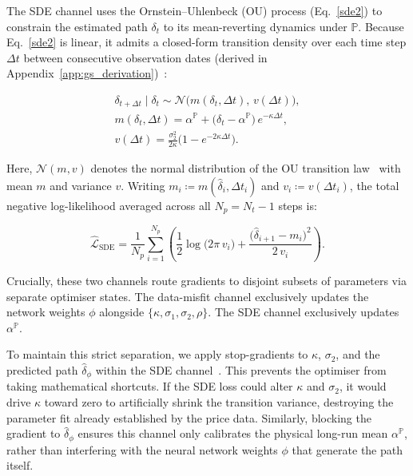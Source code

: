 \documentclass[sigconf, authorversion=true, nonacm=true]{acmart}
\begin{document}
The SDE channel uses the Ornstein--Uhlenbeck (OU) process (Eq.~\ref{sde2}) to constrain the estimated path $\delta_t$ to its mean-reverting dynamics under $\mathbb{P}$. Because Eq.~\ref{sde2} is linear, it admits a closed-form transition density over each time step $\Delta t$ between consecutive observation dates (derived in Appendix~\ref{app:gs_derivation})~\cite{Schwartz1997TheHedging, vasicek1977equilibrium}:

\begin{equation}
\begin{gathered}
  \delta_{t+\Delta t} \mid \delta_t \sim \mathcal{N}\!\big(m(\delta_t, \Delta t),\, v(\Delta t)\big), \\
  m(\delta_t, \Delta t) = \alpha^{\mathbb{P}} + \big(\delta_t - \alpha^{\mathbb{P}}\big)\,e^{-\kappa \Delta t}, \\
  v(\Delta t) = \frac{\sigma_2^2}{2\kappa} \Big(1 - e^{-2\kappa \Delta t}\Big).
\end{gathered}
\end{equation}

Here, $\mathcal{N}(m, v)$ denotes the normal distribution of the OU transition law~\cite{uhlenbeck1930theory, vasicek1977equilibrium} with mean $m$ and variance $v$. Writing $m_i \coloneqq m(\hat{\delta}_i, \Delta t_i)$ and $v_i \coloneqq v(\Delta t_i)$, the total negative log-likelihood averaged across all $N_p = N_t - 1$ steps is:

\begin{equation}
    \hat{\mathcal{L}}_{\text{SDE}} = \frac{1}{N_p}
  \sum_{i=1}^{N_p} \left(
    \frac{1}{2}\log\!\big(2\pi\, v_i\big)
      + \frac{\big(\hat{\delta}_{i+1} - m_i\big)^2}{2\,v_i} \right).
\end{equation}

Crucially, these two channels route gradients to disjoint subsets of parameters via separate optimiser states. The data-misfit channel exclusively updates the network weights $\phi$ alongside $\{\kappa, \sigma_1, \sigma_2, \rho\}$. The SDE channel exclusively updates $\alpha^{\mathbb{P}}$.

To maintain this strict separation, we apply stop-gradients to $\kappa$, $\sigma_2$, and the predicted path $\hat\delta_\phi$ within the SDE channel~\cite{bradbury2018jax}. This prevents the optimiser from taking mathematical shortcuts. If the SDE loss could alter $\kappa$ and $\sigma_2$, it would drive $\kappa$ toward zero to artificially shrink the transition variance, destroying the parameter fit already established by the price data. Similarly, blocking the gradient to $\hat\delta_\phi$ ensures this channel only calibrates the physical long-run mean $\alpha^{\mathbb{P}}$, rather than interfering with the neural network weights $\phi$ that generate the path itself.
\end{document}

